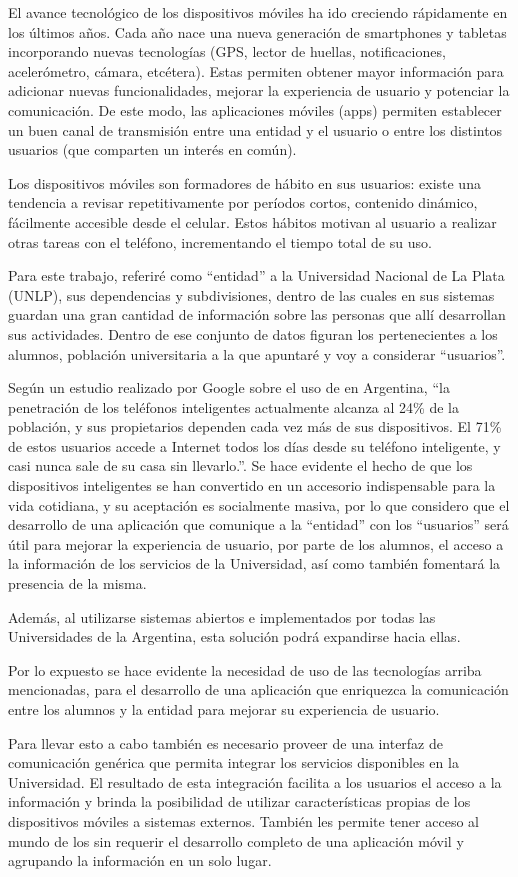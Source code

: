 El avance tecnológico de los dispositivos móviles ha ido creciendo rápidamente
en los últimos años. Cada año nace una nueva generación de smartphones y
tabletas incorporando nuevas tecnologías (GPS, lector de huellas,
notificaciones, acelerómetro, cámara, etcétera). Estas permiten obtener mayor
información para adicionar nuevas funcionalidades, mejorar la experiencia de
usuario y potenciar la comunicación. De este modo, las aplicaciones móviles
(apps) permiten establecer un buen canal de transmisión entre una entidad y el
usuario o entre los distintos usuarios (que comparten un interés en común).

Los dispositivos móviles son formadores de hábito en sus usuarios: existe una tendencia a revisar repetitivamente por períodos cortos, contenido dinámico, fácilmente accesible desde el celular\cite{oulasvirta2012habits}.
Estos hábitos motivan al usuario a realizar otras tareas con el teléfono, incrementando el tiempo total de su uso.

Para este trabajo, referiré como “entidad” a la Universidad Nacional de La Plata
(UNLP), sus dependencias y subdivisiones, dentro de las cuales en sus sistemas guardan una gran cantidad
de información sobre las personas que allí desarrollan sus actividades. Dentro
de ese conjunto de datos figuran los pertenecientes a los alumnos, población
universitaria a la que apuntaré y voy a considerar “usuarios”.

Según un estudio realizado por Google sobre el uso de 
en Argentina, \cite{GoogleEstudioSmartphones} ``la penetración de los teléfonos
inteligentes actualmente alcanza al 24\% de la población, y sus propietarios
dependen cada vez más de sus dispositivos. El 71\% de estos usuarios accede a
Internet todos los días desde su teléfono inteligente, y casi nunca sale de su
casa sin llevarlo.''. Se hace evidente el hecho de que los dispositivos
inteligentes se han convertido en un accesorio indispensable para la vida
cotidiana, y su aceptación es socialmente masiva, por lo que considero que el
desarrollo de una aplicación que comunique a la “entidad” con los “usuarios”
será útil para mejorar la experiencia de usuario, por parte de los alumnos, el
acceso a la información de los servicios de la Universidad, así como también
fomentará la presencia de la misma.

Además, al utilizarse sistemas abiertos e implementados por todas las
Universidades de la Argentina, esta solución podrá expandirse hacia ellas.

Por lo expuesto se hace evidente la necesidad de uso de
las tecnologías arriba mencionadas, para el desarrollo de una aplicación que
enriquezca la comunicación entre los alumnos y la entidad para mejorar su
experiencia de usuario.

Para llevar esto a cabo también es necesario proveer de una interfaz de comunicación genérica que permita integrar los servicios disponibles en la Universidad. El resultado de esta integración facilita a los usuarios el acceso a la información y brinda la posibilidad de utilizar características propias de los dispositivos móviles a sistemas externos. También les permite tener acceso al mundo de los  sin requerir el desarrollo completo de una aplicación móvil y agrupando la información en un solo lugar.
